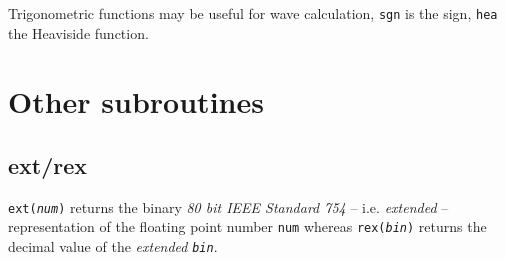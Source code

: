 \documentclass[a4paper, 10pt]{article}
\begin{document}
	Trigonometric functions may be useful for wave calculation, \texttt{sgn} is the sign, \texttt{hea} the Heaviside function.

	\section{Other subroutines}

	\subsection{ext/rex}

	\texttt{ext(\textit{num})} returns the binary {\it 80 bit IEEE Standard 754} -- i.e. \textit{extended} -- representation of the floating point number \texttt{num} whereas \texttt{rex(\textit{bin})} returns the decimal value of the \textit{extended} \texttt{\textit{bin}}.
\end{document}

